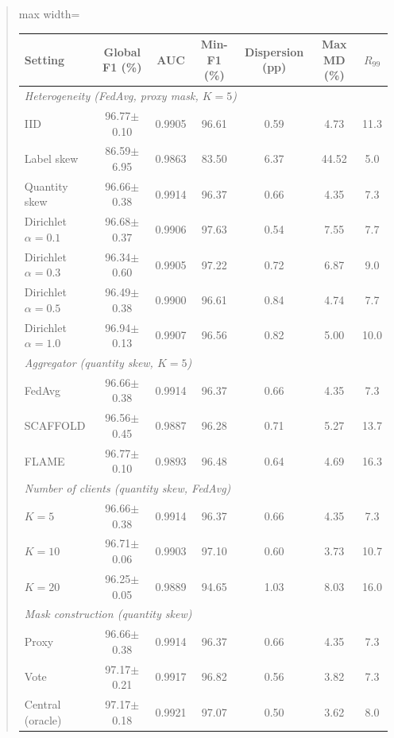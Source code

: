 \documentclass[11pt]{article}
\newenvironment{excerpt}{\begin{quote}\sloppy}{\end{quote}}
\begin{document}
\begin{excerpt}
\begin{table}[H]
\color{red}
\setlength{\tabcolsep}{4pt}
\renewcommand{\arraystretch}{1.05}
\begin{adjustbox}{max width=\linewidth}
\begin{tabular}{lcccccc}
\hline\toprule
\textbf{Setting} & \textbf{Global F1 (\%)} & \textbf{AUC} & \textbf{Min-F1 (\%)} & \textbf{Dispersion (pp)} & \textbf{Max MD (\%)} & \textbf{$R_{99}$} \\
\hline\toprule
\multicolumn{7}{l}{\textit{Heterogeneity (FedAvg, proxy mask, $K{=}5$)}} \\
IID & 96.77$\pm$0.10 & 0.9905 & 96.61 & 0.59 & 4.73 & 11.3 \\
Label skew & 86.59$\pm$6.95 & 0.9863 & 83.50 & 6.37 & 44.52 & 5.0 \\
Quantity skew & 96.66$\pm$0.38 & 0.9914 & 96.37 & 0.66 & 4.35 & 7.3 \\
Dirichlet $\alpha{=}0.1$ & 96.68$\pm$0.37 & 0.9906 & 97.63 & 0.54 & 7.55 & 7.7 \\
Dirichlet $\alpha{=}0.3$ & 96.34$\pm$0.60 & 0.9905 & 97.22 & 0.72 & 6.87 & 9.0 \\
Dirichlet $\alpha{=}0.5$ & 96.49$\pm$0.38 & 0.9900 & 96.61 & 0.84 & 4.74 & 7.7 \\
Dirichlet $\alpha{=}1.0$ & 96.94$\pm$0.13 & 0.9907 & 96.56 & 0.82 & 5.00 & 10.0 \\
\midrule
\multicolumn{7}{l}{\textit{Aggregator (quantity skew, $K{=}5$)}} \\
FedAvg & 96.66$\pm$0.38 & 0.9914 & 96.37 & 0.66 & 4.35 & 7.3 \\
SCAFFOLD & 96.56$\pm$0.45 & 0.9887 & 96.28 & 0.71 & 5.27 & 13.7 \\
FLAME & 96.77$\pm$0.10 & 0.9893 & 96.48 & 0.64 & 4.69 & 16.3 \\
\midrule
\multicolumn{7}{l}{\textit{Number of clients (quantity skew, FedAvg)}} \\
$K{=}5$ & 96.66$\pm$0.38 & 0.9914 & 96.37 & 0.66 & 4.35 & 7.3 \\
$K{=}10$ & 96.71$\pm$0.06 & 0.9903 & 97.10 & 0.60 & 3.73 & 10.7 \\
$K{=}20$ & 96.25$\pm$0.05 & 0.9889 & 94.65 & 1.03 & 8.03 & 16.0 \\
\midrule
\multicolumn{7}{l}{\textit{Mask construction (quantity skew)}} \\
Proxy & 96.66$\pm$0.38 & 0.9914 & 96.37 & 0.66 & 4.35 & 7.3 \\
Vote & 97.17$\pm$0.21 & 0.9917 & 96.82 & 0.56 & 3.82 & 7.3 \\
Central (oracle) & 97.17$\pm$0.18 & 0.9921 & 97.07 & 0.50 & 3.62 & 8.0 \\

\end{tabular}
\end{adjustbox}
\end{table}
\end{excerpt}
\end{document}
